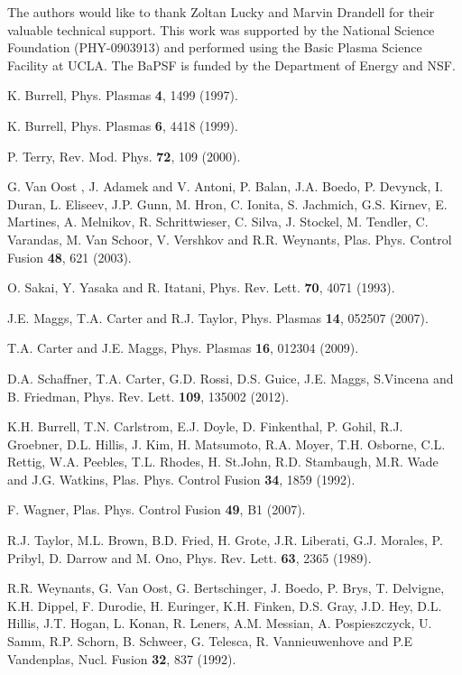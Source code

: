 \documentclass[aip,pop,amsmath,amssymb,reprint,superscriptaddress]{revtex4-1} %
\begin{document}
The authors would like to thank Zoltan Lucky and Marvin Drandell for their valuable technical support.  This work
was supported by the National Science Foundation (PHY-0903913) and performed using the Basic Plasma Science Facility at UCLA. The BaPSF is funded by the
Department of Energy and NSF.

\providecommand{\noopsort}[1]{}\providecommand{\singleletter}[1]{#1}%
\begin{thebibliography}{10}

K. Burrell, Phys. Plasmas {\bf 4},  1499  (1997).

K. Burrell, Phys. Plasmas {\bf 6},  4418  (1999).

P. Terry, Rev. Mod. Phys. {\bf 72},  109  (2000).

G. Van Oost , J. Adamek and V. Antoni, P. Balan, J.A. Boedo, P. Devynck, I. Duran, L. Eliseev, J.P. Gunn, M. Hron, C. Ionita, S. Jachmich, G.S. Kirnev, E. Martines, A. Melnikov, R. Schrittwieser, C. Silva, J. Stockel, M. Tendler, C. Varandas, M. Van Schoor, V. Vershkov and R.R. Weynants, Plas. Phys. Control Fusion {\bf 48}, 621 (2003).

O. Sakai, Y. Yasaka and R. Itatani, Phys. Rev. Lett. {\bf 70},  4071 (1993).

J.E. Maggs, T.A. Carter and R.J. Taylor, Phys. Plasmas {\bf 14},  052507  (2007).

T.A. Carter and J.E. Maggs, Phys. Plasmas {\bf 16},  012304  (2009).

D.A. Schaffner, T.A. Carter, G.D. Rossi, D.S. Guice, J.E. Maggs, S.Vincena and B. Friedman, Phys. Rev. Lett. {\bf 109}, 135002 (2012).

K.H. Burrell, T.N. Carlstrom, E.J. Doyle, D. Finkenthal, P. Gohil, R.J. Groebner, D.L. Hillis, J. Kim, H. Matsumoto, R.A. Moyer, T.H. Osborne, C.L. Rettig, W.A. Peebles, T.L. Rhodes, H. St.John, R.D. Stambaugh, M.R. Wade and J.G. Watkins, Plas. Phys. Control Fusion {\bf 34}, 1859 (1992). 

F. Wagner, Plas. Phys. Control Fusion {\bf 49}, B1 (2007).

R.J. Taylor, M.L. Brown, B.D. Fried, H. Grote, J.R. Liberati, G.J. Morales, P. Pribyl, D. Darrow and M. Ono, Phys. Rev. Lett. {\bf 63},  2365  (1989).

R.R. Weynants, G. Van Oost, G. Bertschinger, J. Boedo, P. Brys, T. Delvigne, K.H. Dippel, F. Durodie, H. Euringer, K.H. Finken, D.S. Gray, J.D. Hey, D.L. Hillis, J.T. Hogan, L. Konan, R. Leners, A.M. Messian, A. Pospieszczyck, U. Samm, R.P. Schorn, B. Schweer, G. Telesca, R. Vannieuwenhove and P.E Vandenplas, Nucl. Fusion {\bf 32},  837  (1992).


\end{thebibliography}
\end{document}
